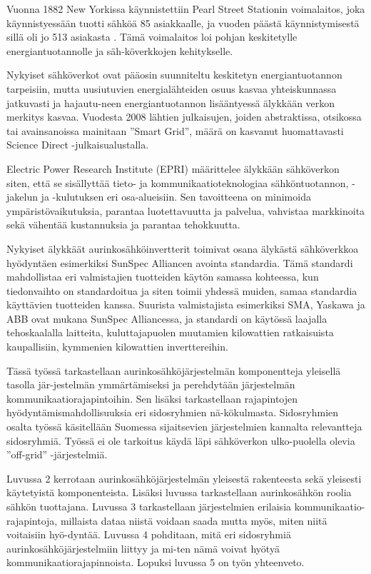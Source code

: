 Vuonna 1882 New Yorkissa käynnistettiin Pearl Street Stationin voimalaitos, joka käynnistyessään tuotti sähköä 85 asiakkaalle, ja vuoden päästä käynnistymisestä sillä oli jo 513 asiakasta \parencite{pearlStreetStation}. Tämä voimalaitos loi pohjan keskitetylle energiantuotannolle ja säh-köverkkojen kehitykselle. 

Nykyiset sähköverkot ovat pääosin suunniteltu keskitetyn energiantuotannon tarpeisiin, mutta uusiutuvien energialähteiden osuus kasvaa yhteiskunnassa jatkuvasti ja hajautu-neen energiantuotannon lisääntyessä älykkään verkon merkitys kasvaa. Vuodesta 2008 lähtien julkaisujen, joiden abstraktissa, otsikossa tai avainsanoissa mainitaan ”Smart Grid”, määrä on kasvanut huomattavasti Science Direct -julkaisualustalla. \parencite{Tuballa&Abundo}

Electric Power Research Institute (EPRI) määrittelee älykkään sähköverkon siten, että se sisällyttää tieto- ja kommunikaatioteknologiaa sähköntuotannon, -jakelun ja -kulutuksen eri osa-alueisiin. Sen tavoitteena on minimoida ympäristövaikutuksia, parantaa luotettavuutta ja palvelua, vahvistaa markkinoita sekä vähentää kustannuksia ja parantaa tehokkuutta. \parencite{SGdefinition}

Nykyiset älykkäät aurinkosähköinvertterit toimivat osana älykästä sähköverkkoa hyödyntäen esimerkiksi SunSpec Alliancen avointa standardia. Tämä standardi mahdollistaa eri valmistajien tuotteiden käytön samassa kohteessa, kun tiedonvaihto on standardoitua ja siten toimii yhdessä muiden, samaa standardia käyttävien tuotteiden kanssa. Suurista valmistajista esimerkiksi SMA, Yaskawa ja ABB ovat mukana SunSpec Alliancessa, ja standardi on käytössä laajalla tehoskaalalla laitteita, kuluttajapuolen muutamien kilowattien ratkaisuista kaupallisiin, kymmenien kilowattien inverttereihin. \parencite{SunSpecProds}

Tässä työssä tarkastellaan aurinkosähköjärjestelmän komponentteja yleisellä tasolla jär-jestelmän ymmärtämiseksi ja perehdytään järjestelmän kommunikaatiorajapintoihin. Sen lisäksi tarkastellaan rajapintojen hyödyntämismahdollisuuksia eri sidosryhmien nä-kökulmasta. Sidosryhmien osalta työssä käsitellään Suomessa sijaitsevien järjestelmien kannalta relevantteja sidosryhmiä. Työssä ei ole tarkoitus käydä läpi sähköverkon ulko-puolella olevia ”off-grid” -järjestelmiä.

Luvussa 2 kerrotaan aurinkosähköjärjestelmän yleisestä rakenteesta sekä yleisesti käytetyistä komponenteista. Lisäksi luvussa tarkastellaan aurinkosähkön roolia sähkön tuottajana. Luvussa 3 tarkastellaan järjestelmien erilaisia kommunikaatio-rajapintoja, millaista dataa niistä voidaan saada mutta myös, miten niitä voitaisiin hyö-dyntää. Luvussa 4 pohditaan, mitä eri sidosryhmiä aurinkosähköjärjestelmiin liittyy ja mi-ten nämä voivat hyötyä kommunikaatiorajapinnoista. Lopuksi luvussa 5 on työn yhteenveto.